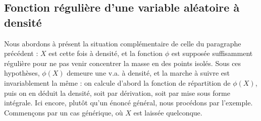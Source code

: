 \newpage

\subsection{Fonction régulière d'une variable aléatoire à densité}

Nous abordons à présent la situation complémentaire de celle du paragraphe précédent : $X$ est cette fois à densité, et la fonction $\phi$ est supposée suffisamment régulière pour ne pas venir concentrer la masse en des points isolés. Sous ces hypothèses, $\phi(X)$ demeure une v.a. à densité, et la marche à suivre est invariablement la même : on calcule d'abord la fonction de répartition de $\phi(X)$, puis on en déduit la densité, soit par dérivation, soit par mise sous forme intégrale. Ici encore, plutôt qu'un énoncé général, nous procédons par l'exemple. Commençons par un cas générique, où $X$ est laissée quelconque.

